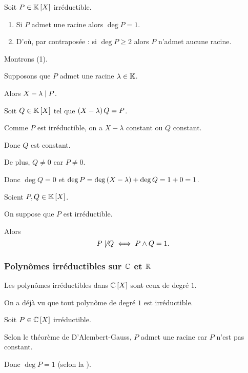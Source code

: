 \begin{rem}
Soit \(P\in\poly\) irréductible.

\begin{enumerate}
\item Si \(P\) admet une racine alors \(\deg P=1\). \\

\item D'où, par contraposée : si \(\deg P\geq2\) alors \(P\) n'admet aucune racine.
\end{enumerate}
\end{rem}

\begin{dem}
Montrons (1).

Supposons que \(P\) admet une racine \(\lambda\in\mathbb{K}\).

Alors \(X-\lambda\mid P\).

Soit \(Q\in\poly\) tel que \(\left(X-\lambda\right)Q=P\).

Comme \(P\) est irréductible, on a \(X-\lambda\) constant ou \(Q\) constant.

Donc \(Q\) est constant.

De plus, \(Q\not=0\) car \(P\not=0\).

Donc \(\deg Q=0\) et \(\deg P=\deg\left(X-\lambda\right)+\deg Q=1+0=1\).
\end{dem}

\begin{rem}
Soient \(P,Q\in\poly\).

On suppose que \(P\) est irréductible.

Alors \[P\not\mid Q\iff P\land Q=1.\]
\end{rem}

\subsubsection{Polynômes irréductibles sur \(\mathbb{C}\) et \(\mathbb{R}\)}

\begin{theo}
Les polynômes irréductibles dans \(\poly[\C]\) sont ceux de degré \(1\).
\end{theo}

\begin{dem}
\increc On a déjà vu que tout polynôme de degré \(1\) est irréductible.

\incdir

Soit \(P\in\poly[\C]\) irréductible.

Selon le théorème de D'Alembert-Gauss, \(P\) admet une racine car \(P\) n'est pas constant.

Donc \(\deg P=1\) (selon la ).
\end{dem}

